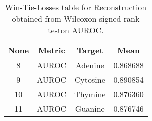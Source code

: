 \begin{table}[H]
\centering
\begin{tabular}{|c|c|c|c|}

 \textbf{None} & \textbf{Metric} & \textbf{Target} &  \textbf{Mean} \\
\hline

             8 &           AUROC &         Adenine &       0.868688 \\
\hline
             9 &           AUROC &        Cytosine &       0.890854 \\
\hline
            10 &           AUROC &         Thymine &       0.876360 \\
\hline
            11 &           AUROC &         Guanine &       0.876746 \\
\hline

\end{tabular}
\caption{Win-Tie-Losses table for Reconstruction obtained from Wilcoxon signed-rank teston AUROC.}
\label{tab:reconstruction_nucleotides_means}
\end{table}